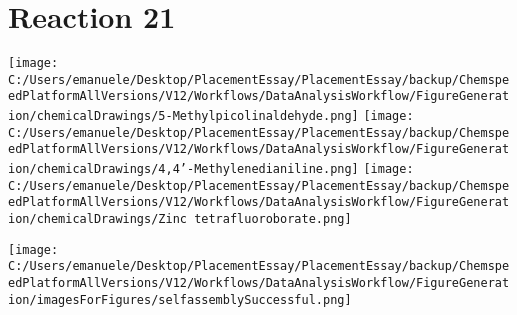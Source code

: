 \documentclass{article}%
\begin{document}
\section*{Reaction 21}%
%
\begin{scheme}[H]%
\begin{minipage}{0.5\textwidth}%
\texttt{[image: C:/Users/emanuele/Desktop/PlacementEssay/PlacementEssay/backup/ChemspeedPlatformAllVersions/V12/Workflows/DataAnalysisWorkflow/FigureGeneration/chemicalDrawings/5-Methylpicolinaldehyde.png]}%
\texttt{[image: C:/Users/emanuele/Desktop/PlacementEssay/PlacementEssay/backup/ChemspeedPlatformAllVersions/V12/Workflows/DataAnalysisWorkflow/FigureGeneration/chemicalDrawings/4,4'-Methylenedianiline.png]}%
\texttt{[image: C:/Users/emanuele/Desktop/PlacementEssay/PlacementEssay/backup/ChemspeedPlatformAllVersions/V12/Workflows/DataAnalysisWorkflow/FigureGeneration/chemicalDrawings/Zinc tetrafluoroborate.png]}%
\end{minipage}%
\begin{minipage}{0.5\textwidth}%
\begin{center}%
\texttt{[image: C:/Users/emanuele/Desktop/PlacementEssay/PlacementEssay/backup/ChemspeedPlatformAllVersions/V12/Workflows/DataAnalysisWorkflow/FigureGeneration/imagesForFigures/selfassemblySuccessful.png]}%
\end{center}%
\end{minipage}%
\caption{Self-assembly of components 3, 17, with Zinc(II) in a 3.0:1.5:1.0 molar ratio in CH$_3$CN at 60\textdegree C for 40h. These are the reagents (starting materials) for reaction 21.}%
\end{scheme}%
\end{document}
